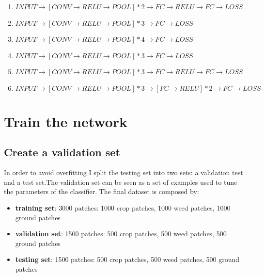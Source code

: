 \documentclass[]{report}
\begin{document}
\begin{enumerate}

\item $ INPUT \rightarrow [CONV \rightarrow RELU \rightarrow POOL]*2 \rightarrow FC \rightarrow RELU \rightarrow FC \rightarrow LOSS $ 

\item $ INPUT \rightarrow [CONV \rightarrow RELU \rightarrow POOL]*3 \rightarrow FC \rightarrow LOSS $ 

\item $ INPUT \rightarrow [CONV \rightarrow RELU \rightarrow POOL]*4 \rightarrow FC \rightarrow LOSS $ 

\item $ INPUT \rightarrow [CONV \rightarrow RELU \rightarrow POOL]*3 \rightarrow FC \rightarrow LOSS $ 

\item $ INPUT \rightarrow [CONV \rightarrow RELU \rightarrow POOL]*3 \rightarrow FC \rightarrow RELU \rightarrow FC \rightarrow LOSS $ 

\item $ INPUT \rightarrow [CONV \rightarrow RELU \rightarrow POOL]*3 \rightarrow [FC \rightarrow RELU]*2 \rightarrow FC \rightarrow LOSS $ 

\end{enumerate}


\section{Train the network}

\subsection{Create a validation set}

In order to avoid overfitting I split the testing set into two sets: a validation test and a test set.The validation set can be seen as a set of examples used to tune the parameters of the classifier. The final dataset is composed by:

\begin{itemize}

	\item \textbf{training set}: 3000 patches: 1000 crop patches, 1000 weed patches, 1000 ground patches
	\item \textbf{validation set}: 1500 patches: 500 crop patches, 500 weed patches, 500 ground patches
	\item \textbf{testing set}: 1500 patches: 500 crop patches, 500 weed patches, 500 ground patches
	
\end{itemize}
\end{document}
